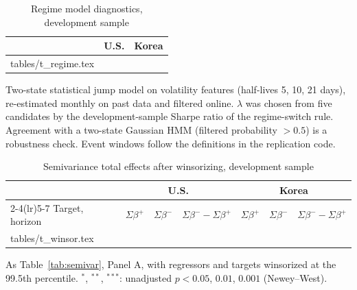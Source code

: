 \documentclass[11pt]{article}
\makeatletter
\newcommand\inputtable[1]{\@@input #1 }
\makeatother
\begin{document}
\begin{table}[!htbp]
\centering
\begin{threeparttable}
\caption{Regime model diagnostics, development sample}\label{tab:regime}
\small
\begin{tabular}{lcc}
\toprule
 & U.S. & Korea \\
\midrule
\inputtable{tables/t_regime.tex}
\bottomrule
\end{tabular}
\begin{tablenotes}\footnotesize
\item Two-state statistical jump model on volatility features (half-lives 5, 10, 21 days), re-estimated monthly on past data and filtered online. $\lambda$ was chosen from five candidates by the development-sample Sharpe ratio of the regime-switch rule. Agreement with a two-state Gaussian HMM (filtered probability $>0.5$) is a robustness check. Event windows follow the definitions in the replication code.
\end{tablenotes}
\end{threeparttable}
\end{table}

\begin{table}[!htbp]
\centering
\begin{threeparttable}
\caption{Semivariance total effects after winsorizing, development sample}\label{tab:winsor}
\scriptsize
\begin{tabular}{lcccccc}
\toprule
 & \multicolumn{3}{c}{U.S.} & \multicolumn{3}{c}{Korea} \\
\cmidrule(lr){2-4}\cmidrule(lr){5-7}
Target, horizon & $\Sigma\beta^{+}$ & $\Sigma\beta^{-}$ & $\Sigma\beta^{-}-\Sigma\beta^{+}$ & $\Sigma\beta^{+}$ & $\Sigma\beta^{-}$ & $\Sigma\beta^{-}-\Sigma\beta^{+}$ \\
\midrule
\inputtable{tables/t_winsor.tex}
\bottomrule
\end{tabular}
\begin{tablenotes}\footnotesize
\item As Table~\ref{tab:semivar}, Panel A, with regressors and targets winsorized at the 99.5th percentile. $^{*}$, $^{**}$, $^{***}$: unadjusted $p<0.05$, $0.01$, $0.001$ (Newey--West).
\end{tablenotes}
\end{threeparttable}
\end{table}
\end{document}
